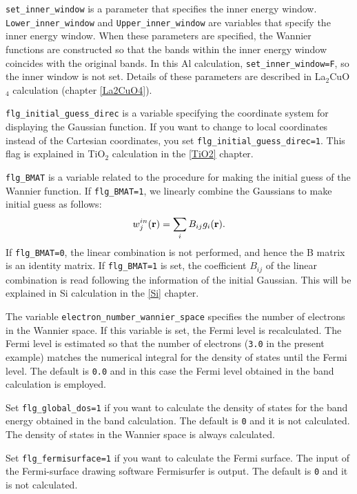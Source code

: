 \documentclass{article}
\begin{document}
\verb+set_inner_window+ is a parameter that specifies the inner energy window. \verb+Lower_inner_window+ and \verb+Upper_inner_window+ are variables that specify the inner energy window. When these parameters are specified, the Wannier functions are constructed so that the bands within the inner energy window coincides with the original bands. In this Al calculation, \verb+set_inner_window=F+, so the inner window is not set. Details of these parameters are described in La$_2$CuO$_4$ calculation (chapter \ref{La2CuO4}).

\verb+flg_initial_guess_direc+ is a variable specifying the coordinate system for displaying the Gaussian function. If you want to change to local coordinates instead of the Cartesian coordinates, you set \verb+flg_initial_guess_direc=1+. This flag is explained in TiO$_2$ calculation in the \ref{TiO2} chapter.

\verb+flg_BMAT+ is a variable related to the procedure for making the initial guess of the Wannier function. If \verb+flg_BMAT=1+, we linearly combine the Gaussians to make initial guess as follows:
\begin{eqnarray}
w_{j}^{in}({\bf r})=\sum_{i}B_{ij} g_i({\bf r}). \nonumber
\end{eqnarray} 
If \verb+flg_BMAT=0+, the linear combination is not performed, and hence the B matrix is an identity matrix. If \verb+flg_BMAT=1+ is set, the coefficient $B_{ij}$ of the linear combination is read following the information of the initial Gaussian. This will be explained in Si calculation in the \ref{Si} chapter. 

The variable {\tt electron\_number\_wannier\_space} specifies the number of electrons in the Wannier space. If this variable is set, the Fermi level is recalculated. The Fermi level is estimated so that the number of electrons ({\tt 3.0} in the present example) matches the numerical integral for the density of states until the Fermi level. The default is {\tt 0.0} and in this case the Fermi level obtained in the band calculation is employed. 

Set {\tt flg\_global\_dos=1} if you want to calculate the density of states for the band energy obtained in the band calculation. The default is {\tt 0} and it is not calculated. The density of states in the Wannier space is always calculated.

Set {\tt flg\_fermisurface=1} if you want to calculate the Fermi surface. The input of the Fermi-surface drawing software {\sc Fermisurfer} is output. The default is {\tt 0} and it is not calculated.  
\vspace{-3mm}
\end{document}
